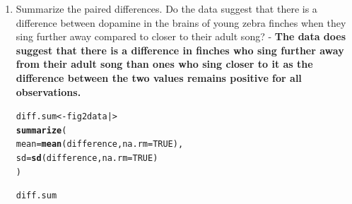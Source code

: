 \documentclass{article}\usepackage[]{graphicx}\usepackage[]{xcolor}
\makeatletter
\newcommand{\hlnum}[1]{\textcolor[rgb]{0.686,0.059,0.569}{#1}}%
\newcommand{\hldef}[1]{\textcolor[rgb]{0.345,0.345,0.345}{#1}}%
\newcommand{\hlkwb}[1]{\textcolor[rgb]{0.69,0.353,0.396}{#1}}%
\newcommand{\hlkwc}[1]{\textcolor[rgb]{0.333,0.667,0.333}{#1}}%
\newcommand{\hlkwd}[1]{\textcolor[rgb]{0.737,0.353,0.396}{\textbf{#1}}}%
\newenvironment{kframe}{%
 \def\at@end@of@kframe{}%
 \ifinner\ifhmode%
  \def\at@end@of@kframe{\end{minipage}}%
  \begin{minipage}{\columnwidth}%
 \fi\fi%
 \def\FrameCommand##1{\hskip\@totalleftmargin \hskip-\fboxsep
 \colorbox{shadecolor}{##1}\hskip-\fboxsep
     \hskip-\linewidth \hskip-\@totalleftmargin \hskip\columnwidth}%
 \MakeFramed {\advance\hsize-\width
   \@totalleftmargin\z@ \linewidth\hsize
   \@setminipage}}%
 {\par\unskip\endMakeFramed%
 \at@end@of@kframe}
\newenvironment{knitrout}{}{} %
\makeatother
\begin{document}
\begin{enumerate}
\begin{enumerate}
\begin{knitrout}
\begin{kframe}
{\ttfamily\noindent\bfseries\color{errorcolor}{\#\# Error: object 'closer.sum' not found}}\end{kframe}
\end{knitrout}
  \item Summarize the paired differences. Do the data suggest
  that there is a difference between dopamine in the brains of
  young zebra finches when they sing further away compared to 
  closer to their adult song? - \textbf{The data does suggest that there is a difference in finches who sing further away from their adult song than ones who sing closer to it as the difference between the two values remains positive for all observations.}
\begin{knitrout}\scriptsize
{}\color{fgcolor}\begin{kframe}
\begin{alltt}
\hldef{diff.sum} \hlkwb{<-} \hldef{fig2data |>}
\hlkwd{summarize}\hldef{(}
  \hlkwc{mean} \hldef{=} \hlkwd{mean}\hldef{(difference,} \hlkwc{na.rm} \hldef{=} \hlnum{TRUE}\hldef{),}
  \hlkwc{sd} \hldef{=} \hlkwd{sd}\hldef{(difference,} \hlkwc{na.rm} \hldef{=} \hlnum{TRUE}\hldef{)}
\hldef{)}
\end{alltt}


{\ttfamily\noindent\bfseries\color{errorcolor}{\#\# Error: object 'fig2data' not found}}\begin{alltt}
\hldef{diff.sum}
\end{alltt}



\end{kframe}
\end{knitrout}
\end{enumerate}
\end{enumerate}
\end{document}

